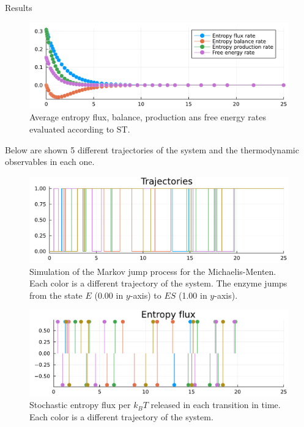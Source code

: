 \documentclass[final]{beamer}
\newlength{\colwidth}
\begin{document}
\begin{frame}[t]
\begin{columns}[t]
\begin{column}{\colwidth}
\begin{block}{Results}
\begin{figure}
\begin{center}
%
\includegraphics[scale=1.2]{graphics/f2.pdf}
\end{center}
\label{fig 2-state-system}
\caption{Average entropy flux, balance, production ans free energy rates evaluated according to ST.}
\end{figure}

Below are shown 5 different trajectories of the system and the thermodynamic observables in each one.

\begin{figure}
\begin{center}
%
\includegraphics[scale=1.2]{graphics/f6.pdf}
\end{center}
\label{fig 2-state-system}
\caption{Simulation of the Markov jump process for the Michaelis-Menten. Each color is a different trajectory of the system. The enzyme jumps from the state $E$ (0.00 in $y$-axis) to $ES$ (1.00 in $y$-axis).}
\end{figure}

\begin{figure}
\begin{center}
%
\includegraphics[scale=1.2]{graphics/f3.pdf}
\end{center}
\label{fig 2-state-system}
\caption{Stochastic entropy flux per $k_B T$ released in each transition in time. Each color is a different trajectory of the system.}
\end{figure}


\end{block}
\end{column}
\end{columns}
\end{frame}
\end{document}
